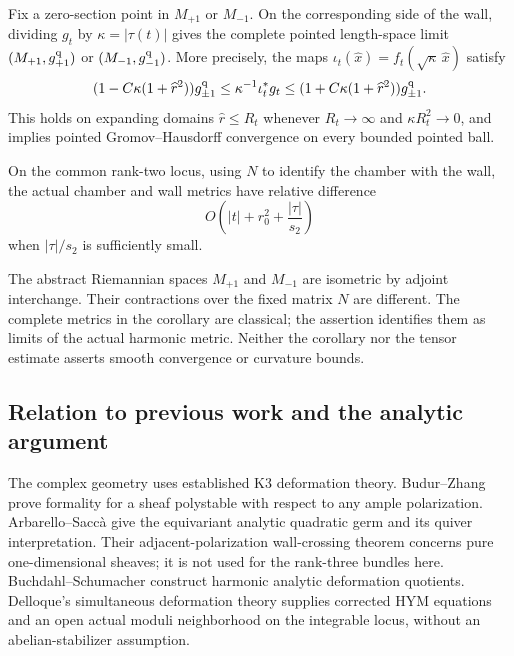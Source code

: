 \begin{corollary}\label{cor:limits}
Fix a zero-section point in $M_{+1}$ or $M_{-1}$. On the corresponding
side of the wall, dividing $g_t$ by $\kappa=|\tau(t)|$ gives the complete
pointed length-space limit
$(M_{+1},g_{+1}^{\rm q})$ or $(M_{-1},g_{-1}^{\rm q})$.
More precisely, the maps
$\iota_t(\widehat x)=f_t(\sqrt\kappa\,\widehat x)$ satisfy
\begin{equation}\label{eq:inner-intro}
(1-C\kappa(1+\widehat r^2))g_{\pm1}^{\rm q}
\le\kappa^{-1}\iota_t^*g_t
\le(1+C\kappa(1+\widehat r^2))g_{\pm1}^{\rm q}.
\end{equation}
This holds on expanding domains $\widehat r\le R_t$ whenever
$R_t\to\infty$ and $\kappa R_t^2\to0$, and implies pointed
Gromov--Hausdorff convergence on every bounded pointed ball.

On the common rank-two locus, using $N$ to identify the chamber with
the wall, the actual chamber and wall metrics have relative difference
\begin{equation}\label{eq:outer-intro}
O\left(|t|+r_0^2+\frac{|\tau|}{s_2}\right)
\end{equation}
when $|\tau|/s_2$ is sufficiently small.
\end{corollary}

The abstract Riemannian spaces $M_{+1}$ and $M_{-1}$ are isometric
by adjoint interchange. Their contractions over the fixed matrix $N$
are different. The complete metrics in the corollary are classical;
the assertion identifies them as limits of the actual harmonic metric.
Neither the corollary nor the tensor estimate asserts smooth convergence
or curvature bounds.

\subsection{Relation to previous work and the analytic argument}

The complex geometry uses established K3 deformation theory. Budur--Zhang
\cite[Theorem~1.2]{BZ19} prove formality for a sheaf polystable with
respect to any ample polarization. Arbarello--Sacc\`a
\cite[Propositions~4.4 and~6.1]{AS18} give the equivariant analytic
quadratic germ and its quiver interpretation. Their adjacent-polarization
wall-crossing theorem concerns pure one-dimensional sheaves; it is not
used for the rank-three bundles here. Buchdahl--Schumacher
\cite{BS21,BS22} construct harmonic analytic deformation quotients.
Delloque's simultaneous deformation theory
\cite[Propositions~4.3--4.6 and Theorem~7.4]{Del25}
supplies corrected HYM equations and an open actual moduli neighborhood
on the integrable locus, without an abelian-stabilizer assumption.

